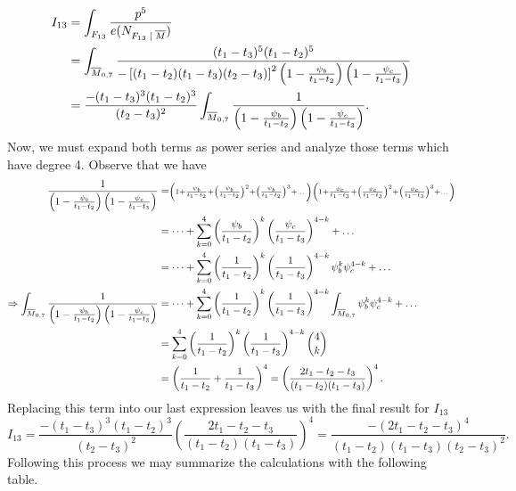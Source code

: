 \documentclass[12pt]{memoir}
\begin{document}
\begin{Ex}
    \begin{align*}
        I_{13}&=\int_{F_{13}}\frac{p^5}{e(N_{F_{13}\mid\ov M})}\\
        &=\int_{\ov M_{0,7}}\frac{(t_1-t_3)^5(t_1-t_2)^5}{-\bonj{(t_1-t_2)(t_1-t_3)(t_2-t_3)}^2\left(1-\frac{\psi_b}{t_1-t_2}\right)\left(1-\frac{\psi_c}{t_1-t_3}\right)}\\
        &=\frac{-(t_1-t_3)^3(t_1-t_2)^3}{(t_2-t_3)^2}\int_{\ov M_{0,7}}\frac{1}{\left(1-\frac{\psi_b}{t_1-t_2}\right)\left(1-\frac{\psi_c}{t_1-t_3}\right)}.
    \end{align*}
    Now, we must expand both terms as power series and analyze those terms which have degree 4. Observe that we have
    \begin{align*}
        \frac{1}{\left(1-\frac{\psi_b}{t_1-t_2}\right)\left(1-\frac{\psi_c}{t_1-t_3}\right)}&=\scriptstyle\left(1+\frac{\psi_b}{t_1-t_2}+\left(\frac{\psi_b}{t_1-t_2}\right)^2+\left(\frac{\psi_b}{t_1-t_2}\right)^3+\dots\right)\left(1+\frac{\psi_c}{t_1-t_3}+\left(\frac{\psi_c}{t_1-t_3}\right)^2+\left(\frac{\psi_c}{t_1-t_3}\right)^3+\dots\right)\\
        &=\dots+\sum_{k=0}^{4}\left(\frac{\psi_b}{t_1-t_2}\right)^k\left(\frac{\psi_c}{t_1-t_3}\right)^{4-k}+\dots\\
        &=\dots+\sum_{k=0}^{4}\left(\frac{1}{t_1-t_2}\right)^k\left(\frac{1}{t_1-t_3}\right)^{4-k}\psi_b^k\psi_c^{4-k}+\dots\\
        \Rightarrow\int_{\overline M_{0,7}}\frac{1}{\left(1-\frac{\psi_b}{t_1-t_2}\right)\left(1-\frac{\psi_c}{t_1-t_3}\right)}&=\dots+\sum_{k=0}^{4}\left(\frac{1}{t_1-t_2}\right)^k\left(\frac{1}{t_1-t_3}\right)^{4-k}\int_{\overline M_{0,7}}\psi_b^k\psi_c^{4-k}+\dots\\
        &=\sum_{k=0}^{4}\left(\frac{1}{t_1-t_2}\right)^k\left(\frac{1}{t_1-t_3}\right)^{4-k}\binom{4}{k}\\
        &=\left(\frac{1}{t_1-t_2}+\frac{1}{t_1-t_3}\right)^4=\left(\frac{2t_1-t_2-t_3}{(t_1-t_2)(t_1-t_3)}\right)^4.
    \end{align*}
    Replacing this term into our last expression leaves us with the final result for $I_{13}$
    $$I_{13}=\frac{-(t_1-t_3)^3(t_1-t_2)^3}{(t_2-t_3)^2}\left(\frac{2t_1-t_2-t_3}{(t_1-t_2)(t_1-t_3)}\right)^4=\frac{-(2t_1-t_2-t_3)^4}{(t_1-t_2)(t_1-t_3)(t_2-t_3)^2}.$$
    Following this process we may summarize the calculations with the following table.
    \begin{figure}[h!]
        \centering

\end{figure}
\end{Ex}
\end{document}
